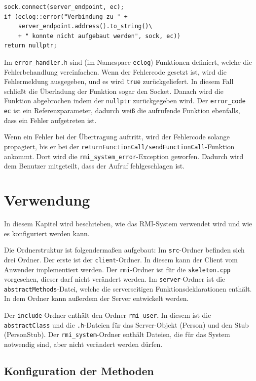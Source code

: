 \documentclass[a4paper,oneside,10pt]{report}
\begin{document}
\begin{lstlisting}
sock.connect(server_endpoint, ec);
if (eclog::error("Verbindung zu " + 
	server_endpoint.address().to_string()\
	+ " konnte nicht aufgebaut werden", sock, ec)) 
return nullptr;
\end{lstlisting}

Im \texttt{error\_handler.h} sind (im Namespace \texttt{eclog}) Funktionen definiert, welche die Fehlerbehandlung vereinfachen. Wenn der Fehlercode gesetzt ist, wird die Fehlermeldung ausgegeben, und es wird \texttt{true} zurückgeliefert. In diesem Fall schließt die Überladung der Funktion sogar den Socket. Danach wird die Funktion abgebrochen indem der \texttt{nullptr} zurückgegeben wird. Der \texttt{error\_code ec} ist ein Referenzparameter, dadurch weiß die aufrufende Funktion ebenfalls, dass ein Fehler aufgetreten ist. 

Wenn ein Fehler bei der Übertragung auftritt, wird der Fehlercode solange propagiert, bis er bei der \texttt{returnFunctionCall/sendFunctionCall}-Funktion ankommt. Dort wird die \texttt{rmi\_system\_error}-Exception geworfen. Dadurch wird dem Benutzer mitgeteilt, dass der Aufruf fehlgeschlagen ist. 

\chapter{Verwendung} \label{verwendung}

In diesem Kapitel wird beschrieben, wie das RMI-System verwendet wird und wie es konfiguriert werden kann. 

Die Ordnerstruktur ist folgendermaßen aufgebaut: Im \texttt{src}-Ordner befinden sich drei Ordner. Der erste ist der \texttt{client}-Ordner. In diesem kann der Client vom Anwender implementiert werden. Der \texttt{rmi}-Ordner ist für die \texttt{skeleton.cpp} vorgesehen, dieser darf nicht verändert werden. Im \texttt{server}-Ordner ist die \texttt{abstractMethods}-Datei, welche die serverseitigen Funktionsdeklarationen enthält. In dem Ordner kann außerdem der Server entwickelt werden. 

Der \texttt{include}-Ordner enthält den Ordner \texttt{rmi\_user}. In diesem ist die \texttt{abstractClass} und die \texttt{.h}-Dateien für das Server-Objekt (Person) und den Stub (PersonStub). Der \texttt{rmi\_system}-Ordner enthält Dateien, die für das System notwendig sind, aber nicht verändert werden dürfen. 

\section{Konfiguration der Methoden}
\end{document}

